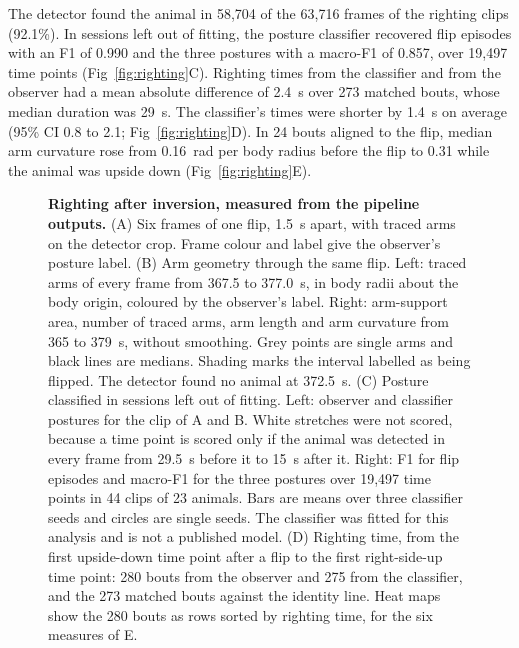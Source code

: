 The detector found the animal in 58,704 of the 63,716 frames of the righting clips (92.1\%).
In sessions left out of fitting, the posture classifier recovered flip episodes with an F1 of 0.990 and the three postures with a macro-F1 of 0.857, over 19,497 time points (Fig~\ref{fig:righting}C).
Righting times from the classifier and from the observer had a mean absolute difference of 2.4~s over 273 matched bouts, whose median duration was 29~s.
The classifier's times were shorter by 1.4~s on average (95\% CI 0.8 to 2.1; Fig~\ref{fig:righting}D).
In 24 bouts aligned to the flip, median arm curvature rose from 0.16~rad per body radius before the flip to 0.31 while the animal was upside down (Fig~\ref{fig:righting}E).

\begin{figure}[!ht]
\caption{{\bf Righting after inversion, measured from the pipeline outputs.}
(A) Six frames of one flip, 1.5~s apart, with traced arms on the detector crop. Frame colour and label give the observer's posture label.
(B) Arm geometry through the same flip. Left: traced arms of every frame from 367.5 to 377.0~s, in body radii about the body origin, coloured by the observer's label. Right: arm-support area, number of traced arms, arm length and arm curvature from 365 to 379~s, without smoothing. Grey points are single arms and black lines are medians. Shading marks the interval labelled as being flipped. The detector found no animal at 372.5~s.
(C) Posture classified in sessions left out of fitting. Left: observer and classifier postures for the clip of A and B. White stretches were not scored, because a time point is scored only if the animal was detected in every frame from 29.5~s before it to 15~s after it. Right: F1 for flip episodes and macro-F1 for the three postures over 19,497 time points in 44 clips of 23 animals. Bars are means over three classifier seeds and circles are single seeds. The classifier was fitted for this analysis and is not a published model.
(D) Righting time, from the first upside-down time point after a flip to the first right-side-up time point: 280 bouts from the observer and 275 from the classifier, and the 273 matched bouts against the identity line. Heat maps show the 280 bouts as rows sorted by righting time, for the six measures of E.
}
\end{figure}

